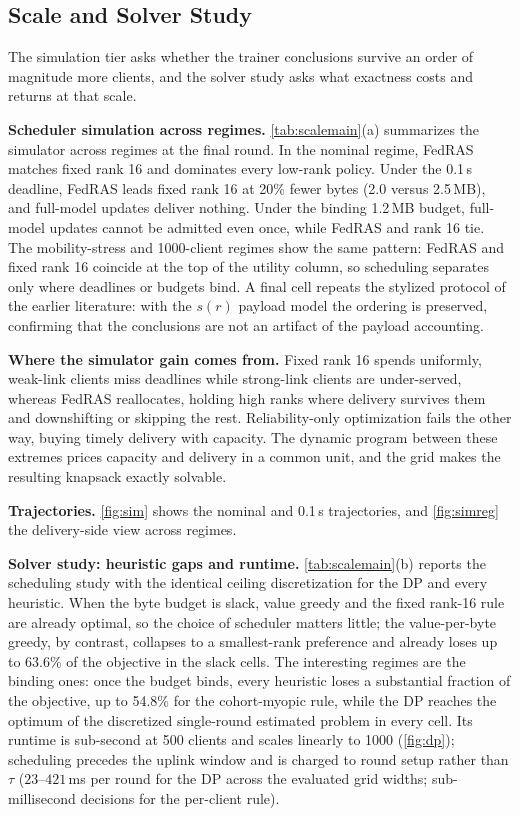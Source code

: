 \documentclass[a4paper,fleqn]{cas-dc}
\begin{document}
\subsection{Scale and Solver Study}
\label{sec:scale}
The simulation tier asks whether the trainer conclusions survive an order of magnitude more clients, and the solver study asks what exactness costs and returns at that scale.
\par
\textbf{Scheduler simulation across regimes.} \label{sec:simsim}
\cref{tab:scalemain}(a) summarizes the simulator across regimes at the final round. In the nominal regime, FedRAS matches fixed rank 16 and dominates every low-rank policy. Under the 0.1\,s deadline, FedRAS leads fixed rank 16 at 20\% fewer bytes (2.0 versus 2.5\,MB), and full-model updates deliver nothing. Under the binding 1.2\,MB budget, full-model updates cannot be admitted even once, while FedRAS and rank 16 tie. The mobility-stress and 1000-client regimes show the same pattern: FedRAS and fixed rank 16 coincide at the top of the utility column, so scheduling separates only where deadlines or budgets bind. A final cell repeats the stylized protocol of the earlier literature: with the $s(r)$ payload model the ordering is preserved, confirming that the conclusions are not an artifact of the payload accounting.
\par
\textbf{Where the simulator gain comes from.} Fixed rank 16 spends uniformly, weak-link clients miss deadlines while strong-link clients are under-served, whereas FedRAS reallocates, holding high ranks where delivery survives them and downshifting or skipping the rest. Reliability-only optimization fails the other way, buying timely delivery with capacity. The dynamic program between these extremes prices capacity and delivery in a common unit, and the grid makes the resulting knapsack exactly solvable.
\par
\textbf{Trajectories.} \cref{fig:sim} shows the nominal and 0.1\,s trajectories, and \cref{fig:simreg} the delivery-side view across regimes.
\par
\label{sec:dp_study}
\textbf{Solver study: heuristic gaps and runtime.} \cref{tab:scalemain}(b) reports the scheduling study with the identical ceiling discretization for the DP and every heuristic. When the byte budget is slack, value greedy and the fixed rank-16 rule are already optimal, so the choice of scheduler matters little; the value-per-byte greedy, by contrast, collapses to a smallest-rank preference and already loses up to 63.6\% of the objective in the slack cells. The interesting regimes are the binding ones: once the budget binds, every heuristic loses a substantial fraction of the objective, up to 54.8\% for the cohort-myopic rule, while the DP reaches the optimum of the discretized single-round estimated problem in every cell. Its runtime is sub-second at 500 clients and scales linearly to 1000 (\cref{fig:dp}); scheduling precedes the uplink window and is charged to round setup rather than $\tau$ ($23$--$421$\,ms per round for the DP across the evaluated grid widths; sub-millisecond decisions for the per-client rule).
\end{document}
